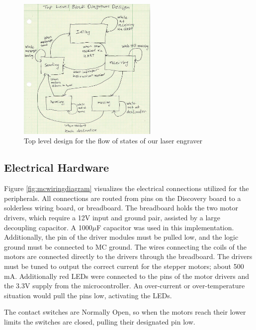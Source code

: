 \documentclass[11pt]{LaTeX-Classes/math-hw}
\begin{document}
 \begin{figure}[H]
   \begin{center}
     \includegraphics[width=0.6\textwidth]{blockdiagram}
     \caption{Top level design for the flow of states of our laser engraver}
     \label{fig:blockdiagram}
   \end{center}
 \end{figure}



\subsection{Electrical Hardware}
Figure \ref{fig:mcwiringdiagram} visualizes the electrical connections utilized for the peripherals.
All connections are routed from pins on the Discovery board to a solderless wiring board, or breadboard.
The breadboard holds the two motor drivers, which require a 12V input and ground pair,
assisted by a large decoupling capacitor. A 1000$\mu$F capacitor was used in this implementation.
Additionally, the  pin of the driver modules must be pulled low, and the logic ground must be
connected to MC ground. The wires connecting the coils of the motors are connected directly to the
drivers through the breadboard. The drivers must be tuned to output the correct current
for the stepper motors; about 500 mA. 
Additionally red LEDs were connected to the  pins of the motor drivers and
the 3.3V supply from the microcontroller. An over-current or over-temperature situation
would pull the  pins low, activating the LEDs.

The contact switches are Normally Open, so when the motors reach their lower limits the switches
are closed, pulling their designated pin low.
\end{document}
